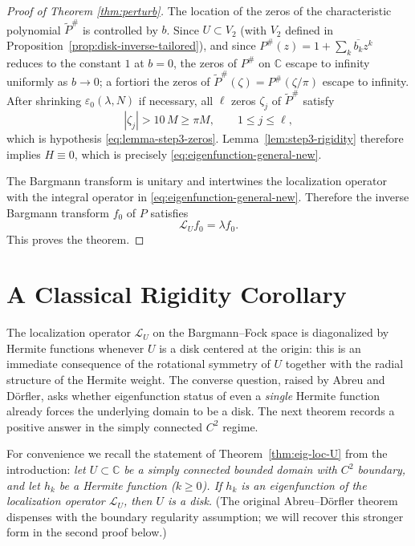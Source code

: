 \documentclass[a4paper,11pt,reqno]{amsart}
\numberwithin{equation}{section}
\theoremstyle{plain} %
\theoremstyle{definition} %
\theoremstyle{remark}
\newcommand{\C}{\mathbb{C}}
\begin{document}
\begin{proof}[Proof of Theorem \ref{thm:perturb}]
The location of the zeros of the characteristic polynomial \(\widetilde P^\#\)
is controlled by \(b\). Since \(U\subset V_2\) (with \(V_2\) defined in
Proposition~\ref{prop:disk-inverse-tailored}), and since
\(P^\#(z)=1+\sum_k\overline{b_k}z^k\) reduces to the constant \(1\) at
\(b=0\), the zeros of \(P^\#\) on \(\C\) escape to infinity uniformly as
\(b\to0\); a fortiori the zeros of \(\widetilde P^\#(\zeta)=P^\#(\zeta/\pi)\)
escape to infinity. After shrinking \(\varepsilon_0(\lambda,N)\) if
necessary, all \(\ell\) zeros \(\zeta_j\) of \(\widetilde P^\#\) satisfy
\[
|\zeta_j|>10\,M\ge\pi M,
\qquad 1\le j\le\ell,
\]
which is hypothesis \eqref{eq:lemma-step3-zeros}. Lemma~\ref{lem:step3-rigidity}
therefore implies $H\equiv 0$, which is precisely
\eqref{eq:eigenfunction-general-new}.

The Bargmann transform is unitary and intertwines the localization operator
with the integral operator in \eqref{eq:eigenfunction-general-new}. Therefore
the inverse Bargmann transform \(f_0\) of \(P\) satisfies
\[
\mathcal L_U f_0=\lambda f_0 .
\]
This proves the theorem.
\end{proof}



\section{A Classical Rigidity Corollary}\label{sec:classical-rigidity}

The localization operator $\mathcal{L}_U$ on the Bargmann--Fock space is
diagonalized by Hermite functions whenever $U$ is a disk centered at the
origin: this is an immediate consequence of the rotational symmetry of $U$
together with the radial structure of the Hermite weight. The converse
question, raised by Abreu and D\"orfler, asks whether eigenfunction status of
even a \emph{single} Hermite function already forces the underlying domain to
be a disk. The next theorem records a positive answer in the simply connected
$C^2$ regime.

For convenience we recall the statement of Theorem~\ref{thm:eig-loc-U} from the introduction:
\emph{let $U\subset \C$ be a simply connected bounded domain with $C^2$
boundary, and let $h_k$ be a Hermite function ($k\ge 0$). If $h_k$ is an
eigenfunction of the localization operator $\mathcal{L}_U$, then $U$ is a
disk.} (The original Abreu--D\"orfler theorem~\cite{Abreu-Doerfler} dispenses
with the boundary regularity assumption; we will recover this stronger form
in the second proof below.)
\end{document}
